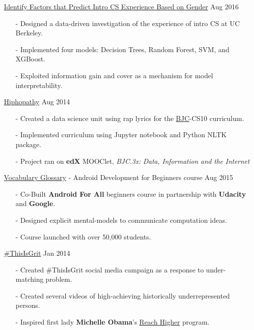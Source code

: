 \documentclass[11pt,article,oneside]{memoir}
\begin{document}
\ind \href{https://github.com/omoju/IntroCSExperiencePrediction}{Identify Factors that Predict Intro CS Experience Based on Gender}  \hfill Aug  2016
\begin{itemize}[noitemsep,nolistsep]
\item[-] Designed a data-driven investigation of the experience of intro CS at UC Berkeley.
\item[-] Implemented four models: Decision Trees, Random Forest, SVM, and XGBoost.
\item[-] Exploited information gain and cover as a mechanism for model interpretability.
\end{itemize}

\ind \href{https://github.com/omoju/hiphopathy}{Hiphopathy}  \hfill Aug 2014
\begin{itemize}[noitemsep,nolistsep]
\item[-] Created a data science unit using rap lyrics for the \href{http://bjc.berkeley.edu/}{BJC}-CS10 curriculum. 
\item[-] Implemented curriculum using Jupyter notebook and Python NLTK package.
\item[-] Project ran on \textbf{edX} MOOClet, \textit{BJC.3x: Data, Information and the Internet}
\end{itemize}

\ind \href{https://developers.google.com/android/for-all/vocab-words/}{Vocabulary Glossary} - Android Development for Beginners course  \hfill Aug 2015
\begin{itemize}[noitemsep,nolistsep]
\item[-] Co-Built \textbf{Android For All} beginners course in partnership with \textbf{Udacity} and \textbf{Google}. 
\item[-] Designed explicit mental-models to communicate computation ideas.
\item[-] Course launched with over 50,000 students.
\end{itemize}

\ind \href{https://www.youtube.com/channel/UCZK66JujoN3KY3sak2kEa2w?&ab_channel=ThisIsGRIT}{\#ThisIsGrit} \hfill Jan 2014
\begin{itemize}[noitemsep,nolistsep]
\item[-] Created \#ThisIsGrit social media campaign as a response to under-matching problem.
\item[-] Created several videos of high-achieving historically underrepresented persons.
\item[-] Inspired first lady \textbf{Michelle Obama}'s \href{https://obamawhitehouse.archives.gov/reach-higher}{Reach Higher} program.
\end{itemize}
\end{document}
